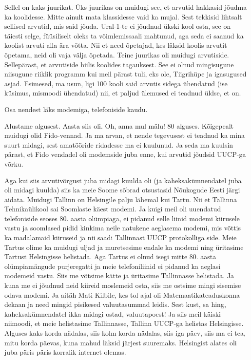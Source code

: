 
Sellel on kaks juurikat. Üks juurikas on muidugi see, et arvutid hakkasid 
jõudma ka koolidesse. Mitte ainult mata klassidesse vaid ka mujal. Sest 
tekkisid lihtsalt sellised arvutid, mis said jõuda. Ural-1-te ei jõudnud ükski 
kool osta, see on täiesti selge, füüsiliselt oleks ta võimlemissaali  mahtunud, 
aga seda ei saanud ka koolist arvuti alla ära võtta. Nii et need õpetajad, kes 
läksid koolis arvutit õpetama, neid oli vaja välja õpetada. Teine juurikas oli 
muidugi arvutiside. Sellepärast, et arvutiside hiilis koolides tagauksest. See 
ei olnud mingisugune niisugune riiklik programm kui meil pärast tuli, eks ole, 
Tiigrihüpe ja igasugused asjad. Esimesed, ma usun, ligi 100 kooli said arvutis 
sidega ühendatud (ise küsimus, mismoodi ühendatud) nii, et paljud ülemused ei 
teadnud üldse, et on. 


Osa nendest läks modemiga, telefoniside kaudu. 


Alustame algusest. Aasta siis oli. Oh, anna mul mälu! 80 alguses. Kõigepealt 
muidugi olid Fido-vennad. Ja ma arvan, et nende tegevusest ei teadnud ka mina 
suurt midagi, sest amatööride ridadesse ma ei kuulunud. Ja seda ma kuulsin 
pärast, et Fido vendadel oli modemside juba enne, kui arvutid jõudsid UUCP-ga 
võrku. 

Aga kui siis arvutivõrgust juba midagi kuulda oli (ja kaheksakümnendatel juba 
oli midagi kuulda) siis ka meie Soome sõbrad otsustasid Nõukogude Eesti järgi 
aidata. Muidugi Tallinn on Helsingile palju lähemal kui Tartu. Nii et Tallinna 
Tehnikaülikool sai Soomlaste käest modemi. Ja 
kuigi meil oli uuendatud telefoniside seoses 80. aasta olümpiaga, ei pidanud 
selle liinid modemi kiirusele vastu ja soomlased pidid kinkima neile natukene 
aeglasema modemi, mis võttis ka madalamaid kiiruseid ja nii saadi Tallinnast 
UUCP protokolliga side. Meie Tartus olime ka muidugi uljad ja muretsesime 
endale ka modemi ning üritasime Tartust Helsingisse helistada. Aga Tartus ei 
olnud isegi mitte 80. aasta olümpiamängude purjeregatti ja meie telefoniliinid 
ei pidanud ka aeglasi modemeid  vastu. Siis me võtsime kätte ja üritasime 
Tallinnasse helistada. Ja kuna me ei jõudnud neid kiireid moslemeid osta, siis 
me ostsime mingi sisemise odava modemi. Ja aitäh Mati Kilbile, kes tol ajal oli Matemaatikateaduskonna dekaan ja need mingid pisikesed valuutasummad 
leidis. Sest kust, sa hing, kaheksakümnendatel ikka midagi ostad, valuutapoest! 
Ja siis meil käiski niimoodi, et meie helistasime Tallinnasse, Tallinn UUCP-ga 
helistas Helsingisse. Alguses kaks korda nädalas, siis kolm korda nädalas, siis 
iga päev, siis ma ei tea, mitu korda päevas, kuna mahud läksid järjest 
suuremaks. Helsingist alates oli juba päris päris korralik internet olemas. 

